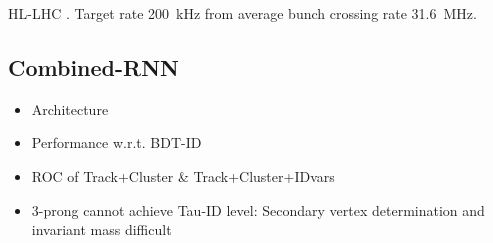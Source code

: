 HL-LHC \cite{hl_lhc}. Target rate \SI{200}{\kilo\hertz} from average bunch
crossing rate \SI{31.6}{\mega\hertz}.

\subsection{Combined-RNN}
\label{sec:rnn_combined}



\begin{itemize}
\item Architecture
\item Performance w.r.t. BDT-ID
\item ROC of Track+Cluster \& Track+Cluster+IDvars
\item 3-prong cannot achieve Tau-ID level: Secondary vertex determination and
  invariant mass difficult
\end{itemize}


